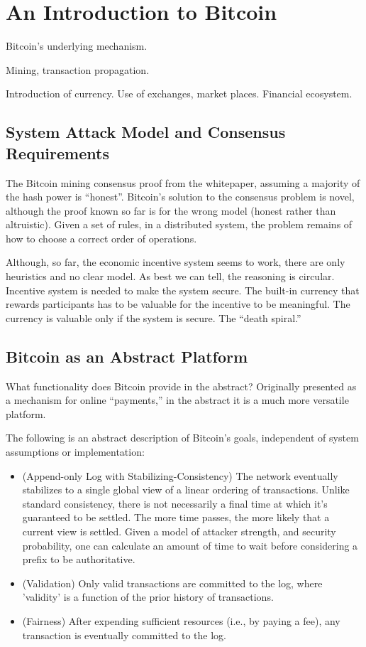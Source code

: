\section{An Introduction to Bitcoin}

Bitcoin's underlying mechanism.

Mining, transaction propagation.

Introduction of currency. Use of exchanges, market places. Financial ecosystem.


\subsection{System Attack Model and Consensus Requirements}

The Bitcoin mining consensus proof from the whitepaper, assuming a majority of the hash power is ``honest''. Bitcoin's solution to the consensus problem is novel, although the proof known so far is for the wrong model (honest rather than altruistic). Given a set of rules, in a distributed system, the problem remains of how to choose a correct order of operations.

Although, so far, the economic incentive system seems to work, there are only heuristics and no clear model. As best we can tell, the reasoning is circular. Incentive system is needed to make the system secure. The built-in currency that rewards participants has to be valuable for the incentive to be meaningful. The currency is valuable only if the system is secure. The ``death spiral.''


\subsection{Bitcoin as an Abstract Platform}

What functionality does Bitcoin provide in the abstract? Originally presented as a mechanism for online ``payments,'' in the abstract it is a much more versatile platform.

The following is an abstract description of Bitcoin's goals, independent of system assumptions or implementation:
\begin{itemize}
\item (Append-only Log with Stabilizing-Consistency) The network eventually stabilizes to a single global view of a linear ordering of transactions. Unlike standard consistency, there is not necessarily a final time at which it's guaranteed to be settled. The more time passes, the more likely that a current view is settled. Given a model of attacker strength, and security probability, one can calculate an amount of time to wait before considering a prefix to be authoritative.
\item (Validation) Only valid transactions are committed to the log, where 'validity' is a function of the prior history of transactions.
\item (Fairness) After expending sufficient resources (i.e., by paying a fee), any transaction is eventually committed to the log.
\end{itemize}

